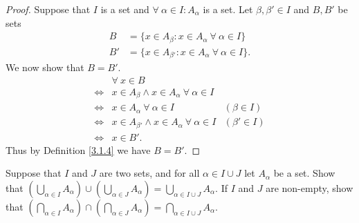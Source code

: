 \begin{proof}
    Suppose that \(I\) is a set and \(\forall\ \alpha \in I : A_{\alpha}\) is a set.
    Let \(\beta, \beta' \in I\) and \(B, B'\) be sets
    \begin{align*}
        B  & = \{x \in A_{\beta} : x \in A_{\alpha} \ \forall\ \alpha \in I\}   \\
        B' & = \{x \in A_{\beta'} : x \in A_{\alpha} \ \forall\ \alpha \in I\}.
    \end{align*}
    We now show that \(B = B'\).
    \begin{align*}
             & \forall\ x \in B                                                                 \\
        \iff & x \in A_{\beta} \land x \in A_{\alpha} \ \forall\ \alpha \in I                   \\
        \iff & x \in A_{\alpha} \ \forall\ \alpha \in I                        & (\beta \in I)  \\
        \iff & x \in A_{\beta'} \land x \in A_{\alpha} \ \forall\ \alpha \in I & (\beta' \in I) \\
        \iff & x \in B'.
    \end{align*}
    Thus by Definition \ref{3.1.4} we have \(B = B'\).
\end{proof}

\begin{exercise}\label{ex 3.4.10}
    Suppose that \(I\) and \(J\) are two sets, and for all \(\alpha \in I \cup J\) let \(A_{\alpha}\) be a set.
    Show that \((\bigcup_{\alpha \in I} A_{\alpha}) \cup (\bigcup_{\alpha \in J} A_{\alpha}) = \bigcup_{\alpha \in I \cup J} A_{\alpha}\).
    If \(I\) and \(J\) are non-empty, show that \((\bigcap_{\alpha \in I} A_{\alpha}) \cap (\bigcap_{\alpha \in J} A_{\alpha}) = \bigcap_{\alpha \in I \cup J} A_{\alpha}\).
\end{exercise}

